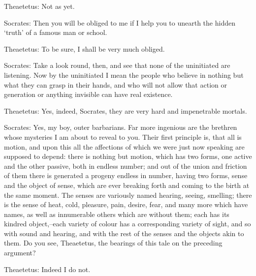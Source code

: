 Theaetetus: Not as yet.

Socrates: Then you will be obliged to me if I help you to unearth the
hidden `truth' of a famous man or school.

Theaetetus: To be sure, I shall be very much obliged.

Socrates: Take a look round, then, and see that none of the uninitiated
are listening. Now by the uninitiated I mean the people who believe in
nothing but what they can grasp in their hands, and who will not allow
that action or generation or anything invisible can have real existence.

Theaetetus: Yes, indeed, Socrates, they are very hard and impenetrable
mortals.

Socrates: Yes, my boy, outer barbarians. Far more ingenious are the
brethren whose mysteries I am about to reveal to you. Their first
principle is, that all is motion, and upon this all the affections of
which we were just now speaking are supposed to depend: there is nothing
but motion, which has two forms, one active and the other passive, both
in endless number; and out of the union and friction of them there is
generated a progeny endless in number, having two forms, sense and the
object of sense, which are ever breaking forth and coming to the birth
at the same moment. The senses are variously named hearing, seeing,
smelling; there is the sense of heat, cold, pleasure, pain, desire,
fear, and many more which have names, as well as innumerable others
which are without them; each has its kindred object,--each variety
of colour has a corresponding variety of sight, and so with sound and
hearing, and with the rest of the senses and the objects akin to them.
Do you see, Theaetetus, the bearings of this tale on the preceding
argument?

Theaetetus: Indeed I do not.

